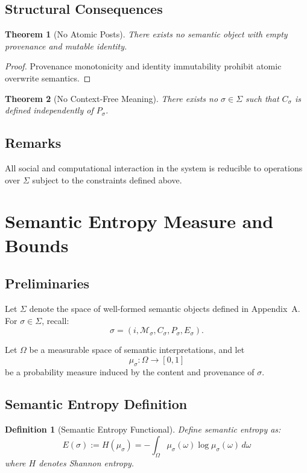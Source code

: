 \documentclass[11pt]{article}
\newtheorem{definition}{Definition}
\newtheorem{theorem}{Theorem}
\begin{document}
\subsection{Structural Consequences}

\begin{theorem}[No Atomic Posts]
There exists no semantic object with empty provenance and mutable identity.
\end{theorem}

\begin{proof}
Provenance monotonicity and identity immutability prohibit atomic overwrite semantics.
\end{proof}

\begin{theorem}[No Context-Free Meaning]
There exists no $\sigma \in \Sigma$ such that $C_\sigma$ is defined independently of
$P_\sigma$.
\end{theorem}

\subsection{Remarks}

All social and computational interaction in the system is reducible to operations over
$\Sigma$ subject to the constraints defined above.

\section{Semantic Entropy Measure and Bounds}

\subsection{Preliminaries}

Let $\Sigma$ denote the space of well-formed semantic objects defined in Appendix~A.
For $\sigma \in \Sigma$, recall:
\[
\sigma = (i, \mathcal{M}_\sigma, C_\sigma, P_\sigma, E_\sigma).
\]

Let $\Omega$ be a measurable space of semantic interpretations, and let
\[
\mu_\sigma : \Omega \to [0,1]
\]
be a probability measure induced by the content and provenance of $\sigma$.

\subsection{Semantic Entropy Definition}

\begin{definition}[Semantic Entropy Functional]
Define semantic entropy as:
\[
E(\sigma) := H(\mu_\sigma) = - \int_\Omega \mu_\sigma(\omega)\log \mu_\sigma(\omega)\, d\omega
\]
where $H$ denotes Shannon entropy.
\end{definition}
\end{document}
